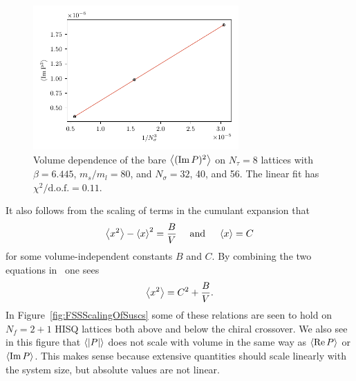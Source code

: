 \begin{figure}
  \centering
  \includegraphics[width=0.7\textwidth]{figs/ImP2_voldepend.pdf}
  \caption{Volume dependence of the bare $\ev{(\Im P)^2}$ on $N_\tau=8$
           lattices with $\beta=6.445$, $m_s/m_l=80$, and $N_\sigma=32$, 40,
           and 56. The linear fit has
           $\chi^2/\text{d.o.f.}=0.11$.}
  \label{fig:ImPvol}
\end{figure}

It also follows from the scaling of terms in the cumulant expansion that
\begin{equation}\label{eq:fssre}
  \ev{x^2}-\ev{x}^2=\frac{B}{V}~~~~\text{and}~~~~\ev{x}=C
\end{equation}
for some volume-independent constants $B$ and $C$. By combining the two
equations in~ one sees
\begin{equation}
  \ev{x^2}=C^2+\frac{B}{V}.
\end{equation}
In Figure~\ref{fig:FSSScalingOfSuscs} some of these relations are seen
to hold on $N_f=2+1$ HISQ lattices both above and below the chiral crossover.
We also see in this figure that $\ev{|P|}$ does not scale with volume 
in the same way as $\ev{\Re P}$ or $\ev{\Im P}$. This makes sense because
extensive quantities should scale linearly with the system size, but
absolute values are not linear. 

